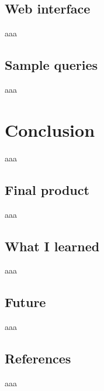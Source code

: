 \documentclass[12pt]{report}
\begin{document}
        \chapter{Web interface}
            aaa

        \chapter{Sample queries}
            aaa

    \part{Conclusion}
        aaa

        \chapter{Final product}
            aaa

        \chapter{What I learned}
            aaa

        \chapter{Future}
            aaa

        \chapter{References}
            aaa
\end{document}
